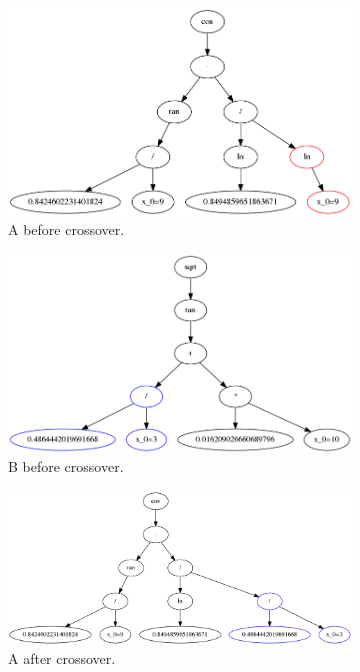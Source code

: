  \begin{figure}
    \begin{subfigure}{0.5\textwidth}
        \includegraphics[width=0.8\linewidth]{figures/leftbefore.png}
        \caption{A before crossover.}
    \end{subfigure}
    \begin{subfigure}{0.5\textwidth}
        \includegraphics[width=0.8\linewidth]{figures/rightbefore.png}
        \caption{B before crossover.}
    \end{subfigure}
        \begin{subfigure}{0.5\textwidth}
        \includegraphics[width=0.8\linewidth]{figures/leftafter.png}
        \caption{A after crossover.}
    \end{subfigure}
    \begin{subfigure}{0.5\textwidth}

\end{subfigure}
\end{figure}
